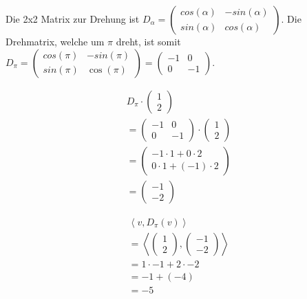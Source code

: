 Die 2x2 Matrix zur Drehung ist $D_\alpha = \begin{pmatrix}
        cos(\alpha) & -sin(\alpha) \\ sin(\alpha) & cos(\alpha)
    \end{pmatrix}$. Die Drehmatrix, welche um $\pi$ dreht, ist somit $D_\pi = \begin{pmatrix}
        cos(\pi) & -sin(\pi) \\ sin(\pi) & \cos(\pi)
    \end{pmatrix} = \begin{pmatrix}
        -1 & 0 \\ 0 & -1
    \end{pmatrix}$.

\begin{align*}
    D_\pi \cdot \begin{pmatrix}
                    1 \\ 2
                \end{pmatrix}                          \\
    = \begin{pmatrix}
          -1 & 0 \\ 0 & -1
      \end{pmatrix} \cdot \begin{pmatrix}
                              1 \\ 2
                          \end{pmatrix}                \\
    = \begin{pmatrix}
          -1 \cdot 1 + 0 \cdot 2 \\ 0 \cdot 1 + (-1) \cdot 2
      \end{pmatrix} \\
    = \begin{pmatrix}
          -1 \\ -2
      \end{pmatrix}
\end{align*}

\begin{align*}
    \left\langle v, D_\pi(v) \right\rangle                    \\
    = \left\langle \begin{pmatrix}
                       1 \\ 2
                   \end{pmatrix}, \begin{pmatrix}
                                      -1 \\ -2
                                  \end{pmatrix} \right\rangle \\
    = 1 \cdot -1 + 2 \cdot -2                                 \\
    = -1 + (-4)                                               \\
    = -5
\end{align*}

